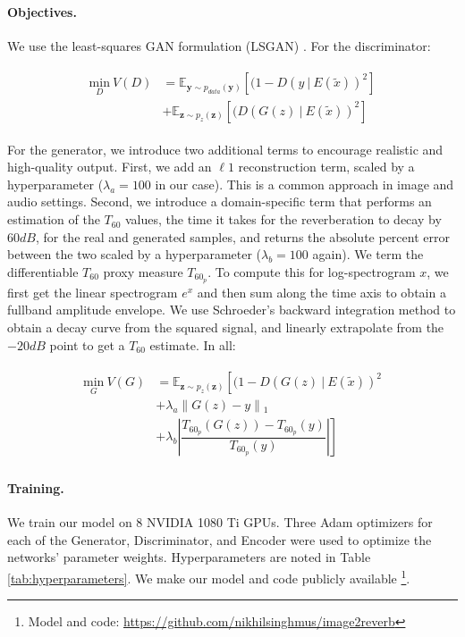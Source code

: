 \documentclass[10pt,twocolumn,letterpaper]{article}
\begin{document}
\paragraph{Objectives.}
We use the least-squares GAN formulation (LSGAN) \cite{mao2017least}. For the discriminator:

\begin{align}
\begin{split}
    \underset{D}{\text{min}}\ V(D) &  = \mathbb{E}_{\mathbf{y} \sim p_{data}(\mathbf{y})}[(1 - D(y\ |\ E(\tilde{x}))^2]\\
    & + \mathbb{E}_{\mathbf{z} \sim p_{z}(\mathbf{z})}[(D(G(z)\ |\ E(\tilde{x}))^2]
\end{split}
\end{align}

For the generator, we introduce two additional terms to encourage realistic and high-quality output. First, we add an $\ell 1$ reconstruction term, scaled by a hyperparameter ($\lambda_a = 100$ in our case). This is a common approach in image and audio settings. Second, we introduce a domain-specific term that performs an estimation of the ${T_{60}}$ values, the time it takes for the reverberation to decay by $60dB$, for the real and generated samples, and returns the absolute percent error between the two scaled by a hyperparameter ($\lambda_b=100$ again). We term the differentiable ${T_{60}}$ proxy measure ${T_{60_p}}$. To compute this for log-spectrogram $x$, we first get the linear spectrogram $e^x$ and then sum along the time axis to obtain a fullband amplitude envelope. We use Schroeder's backward integration method to obtain a decay curve from the squared signal, and linearly extrapolate from the $-20dB$ point to get a ${T_{60}}$ estimate. In all:

\begin{align}
\begin{split}
    \underset{G}{\text{min}}\ V(G) &= \mathbb{E}_{\mathbf{z} \sim p_{z}(\mathbf{z})} \left[ \right. (1 - D(G(z)\ |\ E(\tilde{x}))^2\\ 
     & + {\lambda_a} \left\lVert G(z) - y \right\rVert {_1} \\
     & + \left. {\lambda_b} \left\lvert \dfrac{{T_{60_p}}(G(z)) - {T_{60_p}}(y)}{{T_{60_p}}(y)} \right\rvert \right] 
\end{split}
\end{align}

\paragraph{Training.}
We train our model on 8 NVIDIA 1080 Ti GPUs. Three Adam optimizers for each of the Generator, Discriminator, and Encoder were used to optimize the networks' parameter weights. Hyperparameters are noted in Table \ref{tab:hyperparameters}. We make our model and code publicly available \footnote{Model and code: \href{https://github.com/nikhilsinghmus/image2reverb}{https://github.com/nikhilsinghmus/image2reverb}}.
\end{document}
